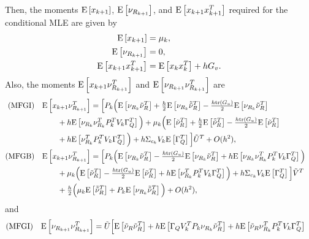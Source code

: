 \begin{theorem}
	Then, the moments $\mathrm{E}\left[ x_{k+1} \right]$, $\mathrm{E}\left[ \nu_{R_{k+1}} \right]$, and $\mathrm{E}\left[ x_{k+1}x_{k+1}^T \right]$ required for the conditional MLE are given by
	\begin{align}
		\expect{x_{k+1}} &= \mu_k, \label{eqn:attEst-prop-Ex_{k+1}} \\
		\expect{\nu_{R_{k+1}}} &= 0, \label{eqn:attEst-prop-EvR_{k+1}} \\
		\expect{x_{k+1}x_{k+1}^T} &= \expect{x_kx_k^T} + hG_v. \label{eqn:attEst-prop-Exx_{k+1}}
	\end{align}
	Also, the moments $\mathrm{E}\left[ x_{k+1}\nu_{R_{k+1}}^T \right]$ and $\mathrm{E}\left[ \nu_{R_{k+1}}\nu_{R_{k+1}}^T \right]$ are
	\begin{subequations} \label{eqn:attEst-prop-ExvR_{k+1}}
		\allowdisplaybreaks
		\begin{flalign}
			\text{(MFGI)} && &\expect{x_{k+1}\nu_{R_{k+1}}^T} = \Big[ P_k\Big( \expect{\nu_{R_k}\tilde{\nu}_R^T} + \tfrac{h}{2}\expect{\nu_{R_k}\tilde{\tilde{\nu}}_R^T} - \tfrac{h\tr{G_u}}{2}\expect{\nu_{R_k}\tilde{\nu}_R^T} && \nonumber \\
			&& &\quad \quad + h\expect{\nu_{R_k}\nu_{R_k}^TP_k^TV_k\Gamma_Q^T} \Big) + \mu_k\Big( \expect{\tilde{\nu}_R^T} + \tfrac{h}{2}\expect{\tilde{\tilde{\nu}}_R^T} - \tfrac{h\tr{G_u}}{2}\expect{\tilde{\nu}_R^T} && \nonumber \\ 
			&& &\quad \quad + h\expect{\nu_{R_k}^TP_k^TV_k\Gamma_Q^T} \Big) + h\Sigma_{c_k}V_k\expect{\Gamma_Q^T} \Big]\tilde{U}^T + O(h^2), && \label{eqn:attEst-prop-ExvR_{k+1}-MFGI} \\
			\text{(MFGB)} && &\expect{x_{k+1}\nu_{R_{k+1}}^T} = \Big[ P_k\Big( \expect{\nu_{R_k}\tilde{\nu}_R^T} - \tfrac{h\tr{G_u}}{2}\expect{\nu_{R_k}\tilde{\nu}_R^T} 
			+ h\expect{\nu_{R_k}\nu_{R_k}^TP_k^TV_k\Gamma_Q^T} \Big) && \nonumber \\
			&& &\quad\quad + \mu_k\Big( \expect{\tilde{\nu}_R^T} - \tfrac{h\tr{G_u}}{2}\expect{\tilde{\nu}_R^T} + h\expect{\nu_{R_k}^TP_k^TV_k\Gamma_Q^T} \Big) + h\Sigma_{c_k}V_k\expect{\Gamma_Q^T} \Big] \tilde{V}^T && \nonumber \\
			&& &\quad\quad + \tfrac{h}{2}\Big( \mu_k\expect{\tilde{\tilde{\nu}}_R^T} + P_k\expect{\nu_{R_k}\tilde{\tilde{\nu}}_R^T} \Big) + O(h^2), && \label{eqn:attEst-prop-ExvR_{k+1}-MFGB}
		\end{flalign}
	\end{subequations}
	and
	\begin{subequations} \label{eqn:attEst-prop-EvRvR_{k+1}}
		\begin{flalign}
			\text{(MFGI)} && &\expect{\nu_{R_{k+1}}\nu_{R_{k+1}}^T} = \tilde{U} \Big[ \expect{\tilde{\nu}_R\tilde{\nu}_R^T} + h\expect{\Gamma_QV_k^TP_k\nu_{R_k}\tilde{\nu}_R^T} + h\expect{\tilde{\nu}_R\nu_{R_k}^TP_k^TV_k\Gamma_Q^T} && \nonumber \\

\end{flalign}
\end{subequations}
\end{theorem}
